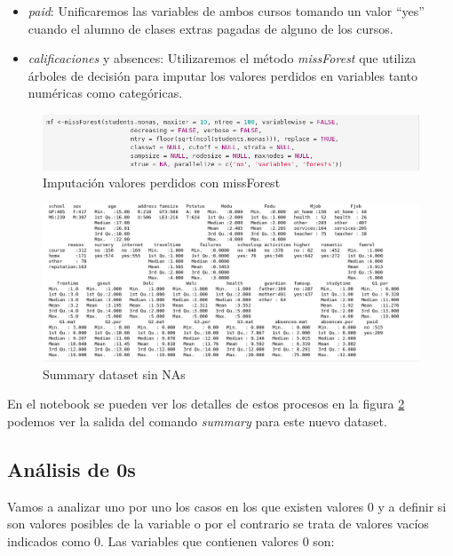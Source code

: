 \documentclass[12pt,a4paper]{article}
\begin{document}
\begin{itemize}
	\item \textit{paid}: Unificaremos las variables de ambos cursos tomando un valor ``yes'' cuando el alumno de clases extras pagadas de alguno de los cursos.
	\item \textit{calificaciones} y {absences}: Utilizaremos el método \textit{missForest} que utiliza árboles de decisión para imputar los valores perdidos en variables tanto numéricas como categóricas.  
	 
\end{itemize}

 \begin{figure}[ht!]
	\centering
	\includegraphics[trim = 0mm 0mm 0mm 0mm, clip,scale=0.5]{images/nonas_cal}
	\caption{Imputación valores perdidos con missForest}
	\label{fig:nonas_cal}
\end{figure}



 \begin{figure}[ht!]
	\centering
	\includegraphics[trim = 0mm 0mm 0mm 0mm, clip,scale=0.4]{images/summary_nonas}
	\caption{Summary dataset sin NAs}
	\label{fig:sum2}
\end{figure}



En el notebook se pueden ver los detalles de estos procesos en la figura \ref{fig:sum2} podemos ver la salida del comando \textit{summary} para este nuevo dataset.


\subsection{Análisis de 0s}
Vamos a analizar uno por uno los casos en los que existen valores 0 y a definir si son valores posibles de la variable o por el contrario se trata de valores vacíos indicados como 0. Las variables que contienen valores 0 son:
\end{document}
